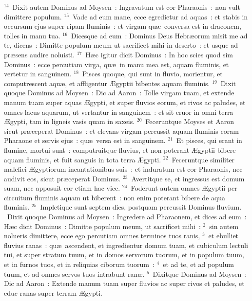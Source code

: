 ${}^{14}$~Dixit autem Dominus ad Moysen~: Ingravatum est cor Pharaonis~: non vult dimittere populum.
${}^{15}$~Vade ad eum mane, ecce egredietur ad aquas~: et stabis in occursum ejus super ripam fluminis~: et virgam qu\ae\ conversa est in draconem, tolles in manu tua.
${}^{16}$~Dicesque ad eum~: Dominus Deus Hebr\ae orum misit me ad te, dicens~: Dimitte populum meum ut sacrificet mihi in deserto~: et usque ad pr\ae sens audire noluisti.
${}^{17}$~H\ae c igitur dicit Dominus~: In hoc scies quod sim Dominus~: ecce percutiam virga, qu\ae\ in manu mea est, aquam fluminis, et vertetur in sanguinem.
${}^{18}$~Pisces quoque, qui sunt in fluvio, morientur, et computrescent aqu\ae , et affligentur \AE gyptii bibentes aquam fluminis.
${}^{19}$~Dixit quoque Dominus ad Moysen~: Dic ad Aaron~: Tolle virgam tuam, et extende manum tuam super aquas \AE gypti, et super fluvios eorum, et rivos ac paludes, et omnes lacus aquarum, ut vertantur in sanguinem~: et sit cruor in omni terra \AE gypti, tam in ligneis vasis quam in saxeis.
${}^{20}$~Feceruntque Moyses et Aaron sicut pr\ae ceperat Dominus~: et elevans virgam percussit aquam fluminis coram Pharaone et servis ejus~: qu\ae\ versa est in sanguinem.
${}^{21}$~Et pisces, qui erant in flumine, mortui sunt~: computruitque fluvius, et non poterant \AE gyptii bibere aquam fluminis, et fuit sanguis in tota terra \AE gypti.
${}^{22}$~Feceruntque similiter malefici \AE gyptiorum incantationibus suis~: et induratum est cor Pharaonis, nec audivit eos, sicut pr\ae ceperat Dominus.
${}^{23}$~Avertitque se, et ingressus est domum suam, nec apposuit cor etiam hac vice.
${}^{24}$~Foderunt autem omnes \AE gyptii per circuitum fluminis aquam ut biberent~: non enim poterant bibere de aqua fluminis.
${}^{25}$~Impletique sunt septem dies, postquam percussit Dominus fluvium.
~\lettrine[lines=10,image=true,loversize=0.05,lraise=-0.03]{D}{}ixit quoque Dominus ad Moysen~: Ingredere ad Pharaonem, et dices ad eum~: H\ae c dicit Dominus~: Dimitte populum meum, ut sacrificet mihi~:
${}^{2}$~sin autem nolueris dimittere, ecce ego percutiam omnes terminos tuos ranis,
${}^{3}$~et ebulliet fluvius ranas~: qu\ae\ ascendent, et ingredientur domum tuam, et cubiculum lectuli tui, et super stratum tuum, et in domos servorum tuorum, et in populum tuum, et in furnos tuos, et in reliquias ciborum tuorum~:
${}^{4}$~et ad te, et ad populum tuum, et ad omnes servos tuos intrabunt ran\ae .
${}^{5}$~Dixitque Dominus ad Moysen~: Dic ad Aaron~: Extende manum tuam super fluvios ac super rivos et paludes, et educ ranas super terram \AE gypti.
